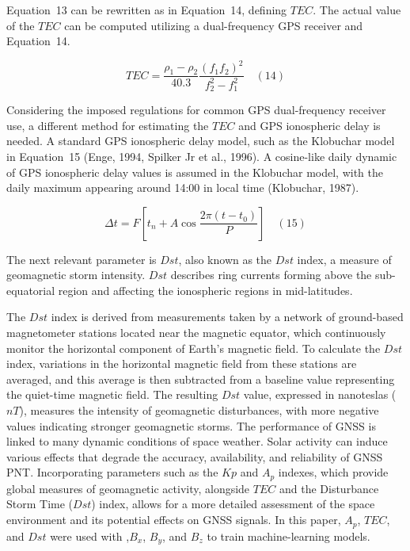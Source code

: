 \documentclass[sn-mathphys-num]{sn-jnl}%
\begin{document}
Equation~13 can be rewritten as in Equation~14, defining $TEC$. The actual value of the $TEC$ can be computed utilizing a dual-frequency GPS receiver and Equation~14.

\begin{equation}
	TEC = \frac{\rho_{1} - \rho_{2}}{40.3} \frac{{\left(f_{1}f_{2}\right)}^{2}}{f_{2}^{2}-f_{1}^{2}}
	\quad\left(14\right)
\end{equation}

Considering the imposed regulations for common GPS dual-frequency receiver use, a different method for estimating the $TEC$ and GPS ionospheric delay is needed. A standard GPS ionospheric delay model, such as the Klobuchar model in Equation~15 (Enge, 1994, Spilker Jr et al., 1996). A cosine-like daily dynamic of GPS ionospheric delay values is assumed in the Klobuchar model, with the daily maximum appearing around 14:00 in local time (Klobuchar, 1987).

\begin{equation}
	\Delta t = F \left[ t_{n} + A \cos \frac{2\pi\left(t-t_{0}\right)}{P} \right]
	\quad\left(15\right)
\end{equation}

The next relevant parameter is $Dst$, also known as the $Dst$ index, a measure of geomagnetic storm intensity. $Dst$ describes ring currents forming above the sub-equatorial region and affecting the ionospheric regions in mid-latitudes.

The $Dst$ index is derived from measurements taken by a network of ground-based magnetometer stations located near the magnetic equator, which continuously monitor the horizontal component of Earth's magnetic field. To calculate the $Dst$ index, variations in the horizontal magnetic field from these stations are averaged, and this average is then subtracted from a baseline value representing the quiet-time magnetic field. The resulting $Dst$ value, expressed in nanoteslas ($nT$), measures the intensity of geomagnetic disturbances, with more negative values indicating stronger geomagnetic storms. The performance of GNSS is linked to many dynamic conditions of space weather. Solar activity can induce various effects that degrade the accuracy, availability, and reliability of GNSS PNT. Incorporating parameters such as the $Kp$ and $A_p$ indexes, which provide global measures of geomagnetic activity, alongside $TEC$ and the Disturbance Storm Time ($Dst$) index, allows for a more detailed assessment of the space environment and its potential effects on GNSS signals. In this paper, $A_p$, $TEC$, and $Dst$ were used with ,$B_x$, $B_y$, and $B_z$ to train machine-learning models.
\end{document}
